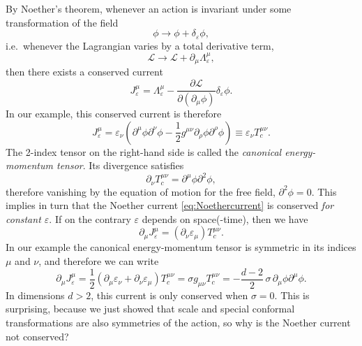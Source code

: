 \documentclass[a4paper,12pt]{article}
\newcommand{\Lagr}{\mathscr{L}}
\numberwithin{equation}{section}
\begin{document}
By Noether's theorem, whenever an action is invariant under some transformation of the field
\begin{equation}
	\phi \to \phi + \delta_\varepsilon \phi,
\end{equation}
i.e.~whenever the Lagrangian varies by a total derivative term,
\begin{equation}
	\Lagr \to \Lagr + \partial_\mu \Lambda_\varepsilon^\mu,
\end{equation}
then there exists a conserved current
\begin{equation}
	J_\varepsilon^\mu = \Lambda^\mu_\varepsilon
	- \frac{\partial \Lagr}{\partial (\partial_\mu \phi)}
	\delta_\varepsilon \phi.
\end{equation}
In our example, this conserved current is therefore
\begin{equation}
	J_\varepsilon^\mu = \varepsilon_\nu
	\left( \partial^\mu \phi \partial^\nu \phi
	- \frac{1}{2} g^{\mu\nu} \partial_\rho \phi \partial^\rho \phi
	\right)
	\equiv \varepsilon_\nu T_c^{\mu\nu}.
	\label{eq:Noethercurrent}
\end{equation}
The 2-index tensor on the right-hand side is called the \emph{canonical energy-momentum tensor}.
Its divergence satisfies
\begin{equation}
	\partial_\nu T_c^{\mu\nu}
	= \partial^\mu \phi \partial^2 \phi,
	\label{eq:Tcanonical:conservation}
\end{equation}
therefore vanishing by the equation of motion for the free field, $\partial^2 \phi = 0$.
This implies in turn that the Noether current \eqref{eq:Noethercurrent} is conserved \emph{for constant $\varepsilon$}.
If on the contrary $\varepsilon$ depends on space(-time), then we have
\begin{equation}
	\partial_\mu J_\varepsilon^\mu
	= (\partial_\nu \varepsilon_\mu) T_c^{\mu\nu}.
\end{equation}
In our example the canonical energy-momentum tensor is symmetric in its indices $\mu$ and $\nu$, and therefore we can write
\begin{equation}
	\partial_\mu J_\varepsilon^\mu
	= \frac{1}{2} (\partial_\mu \varepsilon_\nu
	+ \partial_\nu \varepsilon_\mu) T_c^{\mu\nu}
	= \sigma g_{\mu\nu} T_c^{\mu\nu}
	= -\frac{d-2}{2} \, \sigma \, \partial_\mu \phi \partial^\mu \phi.
\end{equation}
In dimensions $d > 2$, this current is only conserved when $\sigma = 0$. This is surprising, because we just showed that scale and special conformal transformations are also symmetries of the action, so why is the Noether current not conserved?
\end{document}
